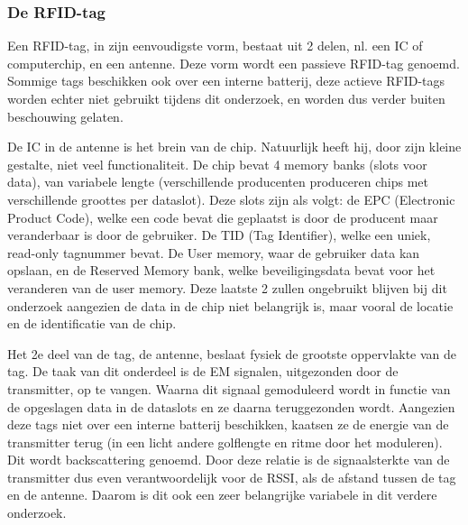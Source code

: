 \subsubsection{De RFID-tag}
\label{sec:De RFID-tag}
Een RFID-tag, in zijn eenvoudigste vorm, bestaat uit 2 delen, nl. een IC of computerchip, en een antenne. Deze vorm wordt een passieve RFID-tag genoemd. Sommige tags beschikken ook over een interne batterij, deze actieve RFID-tags worden echter niet gebruikt tijdens dit onderzoek, en worden dus verder buiten beschouwing gelaten.\autocite{atlasrfidstore2022} 

De IC in de antenne is het brein van de chip. Natuurlijk heeft hij, door zijn kleine gestalte, niet veel functionaliteit. De chip bevat 4 memory banks (slots voor data), van variabele lengte (verschillende producenten produceren chips met verschillende groottes per dataslot). Deze slots zijn als volgt: de EPC (Electronic Product Code), welke een code bevat die geplaatst is door de producent maar veranderbaar is door de gebruiker. De TID (Tag Identifier), welke een uniek, read-only tagnummer bevat. De User memory, waar de gebruiker data kan opslaan, en de Reserved Memory bank, welke beveiligingsdata bevat voor het veranderen van de user memory.\autocite{Smiley2017} Deze laatste 2 zullen ongebruikt blijven bij dit onderzoek aangezien de data in de chip niet belangrijk is, maar vooral de locatie en de identificatie van de chip.

Het 2e deel van de tag, de antenne, beslaat fysiek de grootste oppervlakte van de tag. De taak van dit onderdeel is de EM signalen, uitgezonden door de transmitter, op te vangen. Waarna dit signaal gemoduleerd wordt in functie van de opgeslagen data in de dataslots en ze daarna teruggezonden wordt. Aangezien deze tags niet over een interne batterij beschikken, kaatsen ze de energie van de transmitter terug (in een licht andere golflengte en ritme door het moduleren). Dit wordt backscattering genoemd. Door deze relatie is de signaalsterkte van de transmitter dus even verantwoordelijk voor de RSSI, als de afstand tussen de tag en de antenne. Daarom is dit ook een zeer belangrijke variabele in dit verdere onderzoek.\autocite{atlasrfidstore2022a}


